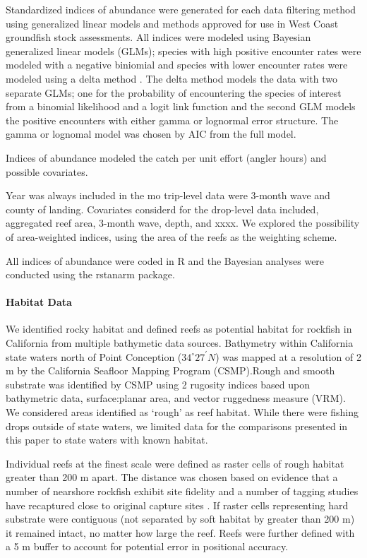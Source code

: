 \documentclass[preprint, 3p,
authoryear]{elsarticle} %
\begin{document}
Standardized indices of abundance were generated for each data filtering
method using generalized linear models and methods approved for use in
West Coast groundfish stock assessments. All indices were modeled using
Bayesian generalized linear models (GLMs); species with high positive
encounter rates were modeled with a negative biniomial and species with
lower encounter rates were modeled using a delta method \citep{Lo1995}.
The delta method models the data with two separate GLMs; one for the
probability of encountering the species of interest from a binomial
likelihood and a logit link function and the second GLM models the
positive encounters with either gamma or lognormal error structure. The
gamma or lognomal model was chosen by AIC from the full model.

Indices of abundance modeled the catch per unit effort (angler hours)
and possible covariates.

Year was always included in the mo trip-level data were 3-month wave and
county of landing. Covariates considerd for the drop-level data
included, aggregated reef area, 3-month wave, depth, and xxxx. We
explored the possibility of area-weighted indices, using the area of the
reefs as the weighting scheme.

All indices of abundance were coded in R and the Bayesian analyses were
conducted using the rstanarm package.

\hypertarget{habitat-data}{%
\paragraph{Habitat Data}\label{habitat-data}}

We identified rocky habitat and defined reefs as potential habitat for
rockfish in California from multiple bathymetic data sources. Bathymetry
within California state waters north of Point Conception
(\(34^\circ 27^\prime N\)) was mapped at a resolution of 2 m by the
California Seafloor Mapping Program (CSMP).Rough and smooth substrate
was identified by CSMP using 2 rugosity indices based upon bathymetric
data, surface:planar area, and vector ruggedness measure (VRM). We
considered areas identified as `rough' as reef habitat. While there were
fishing drops outside of state waters, we limited data for the
comparisons presented in this paper to state waters with known habitat.

Individual reefs at the finest scale were defined as raster cells of
rough habitat greater than 200 m apart. The distance was chosen based on
evidence that a number of nearshore rockfish exhibit site fidelity and a
number of tagging studies have recaptured close to original capture
sites \citep{Lea1999, Matthew1990, Hannah2011, Hannah2012}. If raster
cells representing hard substrate were contiguous (not separated by soft
habitat by greater than 200 m) it remained intact, no matter how large
the reef. Reefs were further defined with a 5 m buffer to account for
potential error in positional accuracy.
\end{document}
